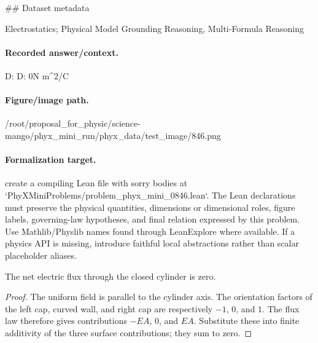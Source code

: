 \#\# Dataset metadata

Electrostatics; Physical Model Grounding Reasoning, Multi-Formula Reasoning

\paragraph{Recorded answer/context.}
D: D: 0N m\textasciicircum{}2/C

\paragraph{Figure/image path.}
/root/proposal\_for\_physic/science-mango/phyx\_mini\_run/phyx\_data/test\_image/846.png

\paragraph{Formalization target.}
create a compiling Lean file with sorry bodies at `PhyXMiniProblems/problem\_phyx\_mini\_0846.lean`. The Lean declarations must preserve the physical quantities, dimensions or dimensional roles, figure labels, governing-law hypotheses, and final relation expressed by this problem.
Use Mathlib/Physlib names found through LeanExplore where available. If a physics API is missing, introduce faithful local abstractions rather than scalar placeholder aliases.

\begin{theorem}
\label{thm:physics:phyx_mini_0846:target}
The net electric flux through the closed cylinder is zero.
\end{theorem}
\begin{proof}
The uniform field is parallel to the cylinder axis.  The orientation factors of the left cap, curved wall, and right cap are respectively $-1$, $0$, and $1$.  The flux law therefore gives contributions $-EA$, $0$, and $EA$.  Substitute these into finite additivity of the three surface contributions; they sum to zero.
\end{proof}

